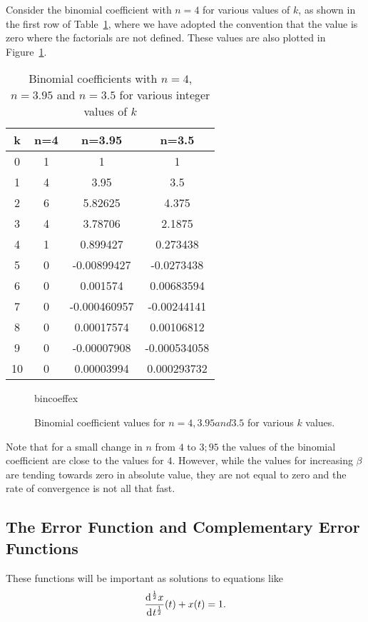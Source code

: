     \begin{example}
      Consider the binomial coefficient with $n=4$ for various values of $k$, as shown in the first row of Table~\ref{tab:binomialex}, where we have adopted the convention that the value is zero where the factorials are not defined. These values are also plotted in Figure~\ref{fig:binomialex}. 

      \begin{table}
	\centering
	\begin{tabular}{|c||c|c|c|}
	  \hline k & n=4&n=3.95&n=3.5 \\
	  \hline \hline
	  0& 1& 1& 1\\ \hline
	  1& 4& 3.95 &3.5\\ \hline
	  2& 6& 5.82625& 4.375\\ \hline
	  3& 4& 3.78706& 2.1875\\ \hline
	  4& 1& 0.899427& 0.273438\\ \hline 
	  5& 0& -0.00899427& -0.0273438\\ \hline
	  6& 0& 0.001574& 0.00683594\\ \hline
	  7& 0& -0.000460957& -0.00244141\\ \hline
	  8& 0&  0.00017574& 0.00106812\\ \hline
	  9& 0& -0.00007908& -0.000534058\\ \hline
	  10& 0& 0.00003994& 0.000293732 \\ \hline
	\end{tabular}
	\caption{Binomial coefficients with $n=4$, $n=3.95$ and $n=3.5$ for various integer values of $k$}
	\label{tab:binomialex}
      \end{table}

      \begin{figure}
	\centering
	{bincoeffex}
	\caption{Binomial coefficient values for $n=4, 3.95 and 3.5$ for various $k$ values.}
	\label{fig:binomialex}
      \end{figure}

      Note that for a small change in $n$ from $4$ to $3;95$ the values of the binomial coefficient are close to the values for $4$. However, while the values for increasing $\beta$ are tending towards zero in absolute value, they are not equal to zero and the rate of convergence is not all that fast.
    \end{example}

    \subsection{The Error Function and Complementary Error Functions}
    These functions will be important as solutions to equations like
    \begin{equation*}
      \frac{\operatorname{d}\hspace*{-1pt}^\frac{1}{2} x}{\operatorname{d}\hspace*{-1pt} t^\frac{1}{2}}(t) + x(t) = 1.
    \end{equation*}

